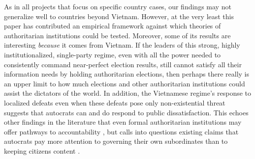 \documentclass[12pt]{article}
\newcommand{\1}{\mathbbm{1}}
\begin{document}
As in all projects that focus on specific country cases, our findings may not generalize well to countries beyond Vietnam. However, at the very least this paper has contributed an empirical framework against which theories of authoritarian institutions could be tested. Moreover, some of its results are interesting \textit{because} it comes from Vietnam. If the leaders of this strong, highly institutionalized, single-party regime, even with all the power needed to consistently command near-perfect election results, still cannot satisfy all their information needs by holding authoritarian elections, then perhaps there really is an upper limit to how much elections and other authoritarian institutions could assist the dictators of the world. In addition, the Vietnamese regime's response to localized defeats even when these defeats pose only non-existential threat suggests that autocrats can and do respond to public dissatisfaction. This echoes other findings in the literature that even formal authoritarian institutions may offer pathways to accountability \citep[e.g.][]{Miller2015,Lorentzen2013,Manion2014}, but calls into questions existing claims that autocrats pay more attention to governing their own subordinates than to keeping citizens content \citep[e.g.][]{Svolik2012}.

\printbibliography[heading=bibintoc]

\newpage
\appendix
\end{document}
